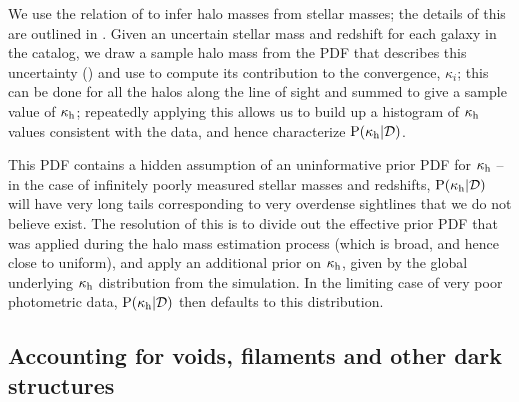 \documentclass[useAMS,usenatbib]{mn2e}
\begin{document}
We use the relation of \citet{BehrooziEtal2010} to infer halo masses
from stellar masses; the details of this \proceedure are outlined in 
. Given an uncertain stellar mass and redshift for
each galaxy in the  catalog, we draw a sample halo mass from the PDF
that describes this uncertainty  ()  and use
 to compute its contribution to the convergence,
$\kappa_i$; this can be done for all the halos along the line of sight
and summed to give a sample value of $\kappa_{\rm h}$;  repeatedly applying
this \proceedure allows us to build up a histogram of $\kappa_{\rm h}$ values
consistent with the data, and hence characterize ${\rm P}(\kappa_{\rm h}|{\mathcal{D}})$. 

This PDF contains a hidden assumption of an uninformative prior PDF for
$\kappa_{\rm h}$ -- in the case of infinitely poorly measured stellar masses and
redshifts, ${\rm P}(\kappa_{\rm h}|{\mathcal{D}})$ will have very long tails corresponding to
very overdense sightlines that we do not believe exist. The resolution of this
is to divide out the effective prior PDF that was applied during the halo mass
estimation process (which is broad, and hence close to uniform), and apply an
additional prior on $\kappa_{\rm h}$, given by the global underlying $\kappa_{\rm h}$
distribution from the simulation. In the limiting  case of very poor
photometric data, ${\rm P}(\kappa_{\rm h}|{\mathcal{D}})$ then defaults to this distribution.





\subsection{Accounting for voids, filaments and other dark structures}
\label{sec:model:voids}
\end{document}
